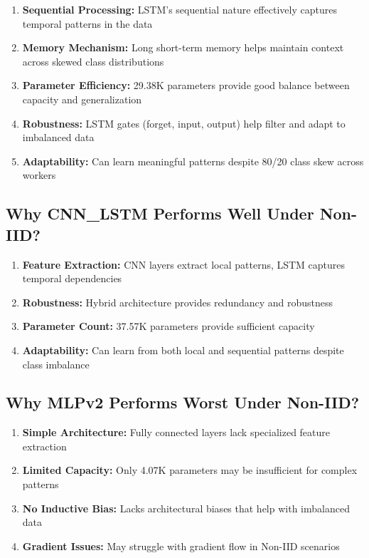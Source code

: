 \documentclass[12pt,a4paper]{article}
\begin{document}
\begin{enumerate}
    \item \textbf{Sequential Processing:} LSTM's sequential nature effectively captures temporal patterns in the data
    \item \textbf{Memory Mechanism:} Long short-term memory helps maintain context across skewed class distributions
    \item \textbf{Parameter Efficiency:} 29.38K parameters provide good balance between capacity and generalization
    \item \textbf{Robustness:} LSTM gates (forget, input, output) help filter and adapt to imbalanced data
    \item \textbf{Adaptability:} Can learn meaningful patterns despite 80/20 class skew across workers
\end{enumerate}

\subsection{Why CNN\_LSTM Performs Well Under Non-IID?}

\begin{enumerate}
    \item \textbf{Feature Extraction:} CNN layers extract local patterns, LSTM captures temporal dependencies
    \item \textbf{Robustness:} Hybrid architecture provides redundancy and robustness
    \item \textbf{Parameter Count:} 37.57K parameters provide sufficient capacity
    \item \textbf{Adaptability:} Can learn from both local and sequential patterns despite class imbalance
\end{enumerate}

\subsection{Why MLPv2 Performs Worst Under Non-IID?}

\begin{enumerate}
    \item \textbf{Simple Architecture:} Fully connected layers lack specialized feature extraction
    \item \textbf{Limited Capacity:} Only 4.07K parameters may be insufficient for complex patterns
    \item \textbf{No Inductive Bias:} Lacks architectural biases that help with imbalanced data
    \item \textbf{Gradient Issues:} May struggle with gradient flow in Non-IID scenarios
\end{enumerate}
\end{document}
